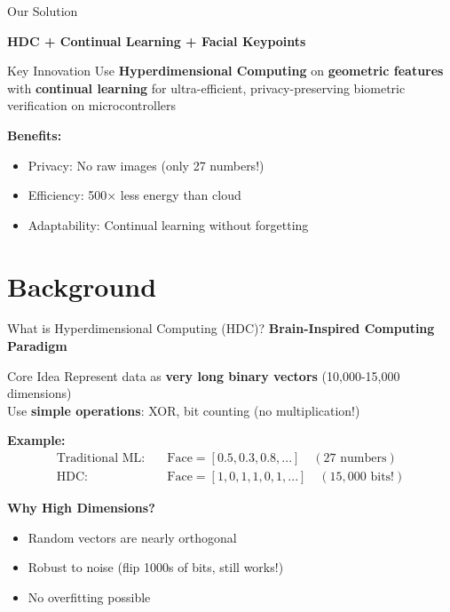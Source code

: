 \documentclass[aspectratio=169]{beamer}
\begin{document}
\begin{frame}{Our Solution}
\begin{center}
\Large
\textbf{HDC + Continual Learning + Facial Keypoints}

\vspace{2em}
\end{center}

\begin{block}{Key Innovation}
Use \textbf{Hyperdimensional Computing} on \textbf{geometric features} with \textbf{continual learning} for ultra-efficient, privacy-preserving biometric verification on microcontrollers
\end{block}

\textbf{Benefits:}
\begin{itemize}
    \item \checkmark Privacy: No raw images (only 27 numbers!)
    \item \checkmark Efficiency: 500× less energy than cloud
    \item \checkmark Adaptability: Continual learning without forgetting
\end{itemize}
\end{frame}

\section{Background}

\begin{frame}{What is Hyperdimensional Computing (HDC)?}
\textbf{Brain-Inspired Computing Paradigm}

\begin{block}{Core Idea}
Represent data as \textbf{very long binary vectors} (10,000-15,000 dimensions)\\
Use \textbf{simple operations}: XOR, bit counting (no multiplication!)
\end{block}

\textbf{Example:}
\begin{align*}
\text{Traditional ML:} & \quad \text{Face} = [0.5, 0.3, 0.8, ...] \quad (27 \text{ numbers}) \\
\text{HDC:} & \quad \text{Face} = [1,0,1,1,0,1,...] \quad (15,000 \text{ bits!})
\end{align*}

\textbf{Why High Dimensions?}
\begin{itemize}
    \item Random vectors are nearly orthogonal
    \item Robust to noise (flip 1000s of bits, still works!)
    \item No overfitting possible
\end{itemize}
\end{frame}
\end{document}
